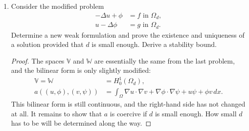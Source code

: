 \documentclass{article}
\begin{document}
\begin{enumerate}
	\item Consider the modified problem
	      \begin{align*}
		      -\Delta u + \phi & = f \text{ in } \Omega_d, \\
		      u - \Delta \phi  & = g \text{ in } \Omega_d.
	      \end{align*}
	      Determine a new weak formulation and prove the existence and uniqueness of a solution provided that $d$ is small enough.
	      Derive a stability bound.
	      \begin{proof}
		      The spaces $\mathbb V$ and $\mathbb W$ are essentially the same from the last problem, and the bilinear form is only slightly modified:
		      \begin{align*}
			      \mathbb V = \mathbb W & = H^1_0(\Omega_d),                                                                           \\
			      a((u,\phi),(v,\psi))  & = \int_\Omega \nabla u \cdot \nabla v + \nabla \phi \cdot \nabla \psi + u \psi + \phi v\,dx.
		      \end{align*}
		      This bilinear form is still continuous, and the right-hand side has not changed at all.
		      It remains to show that $a$ is coercive if $d$ is small enough.
		      How small $d$ has to be will be determined along the way.


\end{proof}
\end{enumerate}
\end{document}
